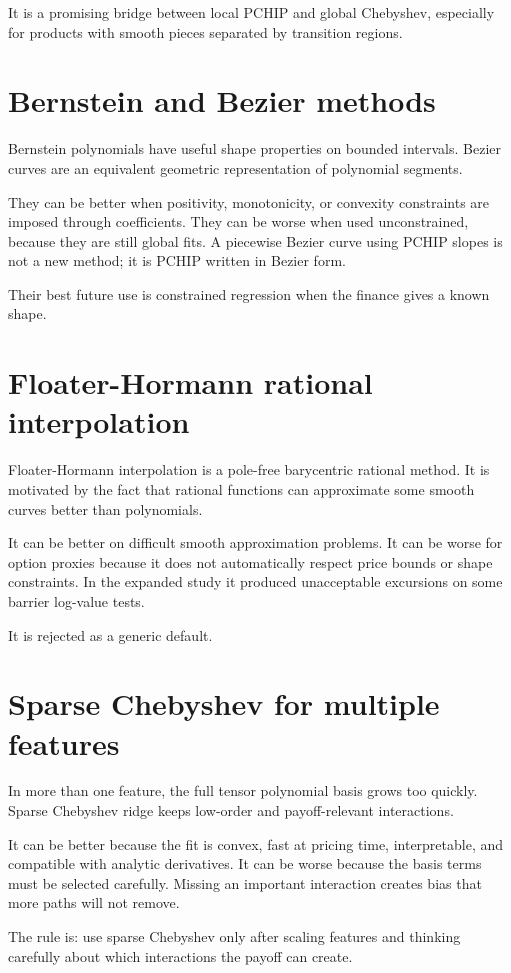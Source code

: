 \documentclass[11pt,oneside]{book}
\theoremstyle{definition}
\begin{document}
It is a promising bridge between local PCHIP and global Chebyshev, especially
for products with smooth pieces separated by transition regions.

\section{Bernstein and Bezier methods}
Bernstein polynomials have useful shape properties on bounded intervals.
Bezier curves are an equivalent geometric representation of polynomial
segments.

They can be better when positivity, monotonicity, or convexity constraints are
imposed through coefficients. They can be worse when used unconstrained,
because they are still global fits. A piecewise Bezier curve using PCHIP slopes
is not a new method; it is PCHIP written in Bezier form.

Their best future use is constrained regression when the finance gives a known
shape.

\section{Floater-Hormann rational interpolation}
Floater-Hormann interpolation is a pole-free barycentric rational method. It is
motivated by the fact that rational functions can approximate some smooth
curves better than polynomials.

It can be better on difficult smooth approximation problems. It can be worse
for option proxies because it does not automatically respect price bounds or
shape constraints. In the expanded study it produced unacceptable excursions
on some barrier log-value tests.

It is rejected as a generic default.

\section{Sparse Chebyshev for multiple features}
In more than one feature, the full tensor polynomial basis grows too quickly.
Sparse Chebyshev ridge keeps low-order and payoff-relevant interactions.

It can be better because the fit is convex, fast at pricing time,
interpretable, and compatible with analytic derivatives. It can be worse
because the basis terms must be selected carefully. Missing an important
interaction creates bias that more paths will not remove.

The rule is: use sparse Chebyshev only after scaling features and thinking
carefully about which interactions the payoff can create.
\end{document}
